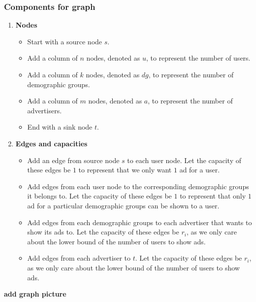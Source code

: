 \documentclass[11pt]{scrartcl}
\begin{document}
\subsubsection{
	Components for graph
}
\begin{enumerate}[label=\alph*.]
	\item{
	      \textbf{Nodes}
	      \begin{itemize}
		      \item Start with a source node $s$.
		      \item Add a column of $n$ nodes, denoted as $u$, to represent the number of users.
		      \item Add a column of $k$ nodes, denoted as $dg$, to represent the number of demographic groups.
		      \item Add a column of $m$ nodes, denoted as $a$, to represent the number of advertisers.
		      \item End with a sink node $t$.
	      \end{itemize}
	      }
	\item{
	      \textbf{Edges and capacities}
	      \begin{itemize}
		      \item{
		            Add an edge from source node $s$ to each user node. Let the capacity of these edges be $1$ to
		            represent that we only want $1$ ad for a user.
		            }
		      \item {
		            Add edges from each user node to the corresponding demographic groups it belongs to.
		            Let the capacity of these edges be $1$ to represent that only $1$ ad for a particular
		            demographic groups can be shown to a user.
		            }
		      \item {
		            Add edges from each demographic groups to each advertiser that wants to show its ads to.
		            Let the capacity of these edges be $r_i$, as we only care about the lower bound of the number of
		            users to show ads.
		            }
		      \item {
		            Add edges from each advertiser to $t$. Let the capacity of these edges be $r_i$,
		            as we only care about the lower bound of the number of
		            users to show ads.
		            }
	      \end{itemize}
	      }
\end{enumerate}
\textbf{add graph picture}
\end{document}
